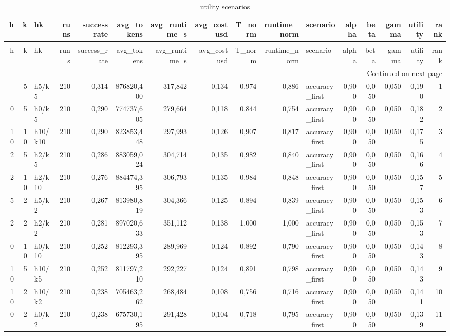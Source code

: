 \begin{longtable}{rrlrrrrrrrlrrrrr}
\caption{utility scenarios} \label{tab:utility_scenarios} \\
\toprule
h & k & hk & runs & success\_rate & avg\_tokens & avg\_runtime\_s & avg\_cost\_usd & T\_norm & runtime\_norm & scenario & alpha & beta & gamma & utility & rank \\
\midrule
\endfirsthead
\caption[]{utility scenarios} \\
\toprule
h & k & hk & runs & success\_rate & avg\_tokens & avg\_runtime\_s & avg\_cost\_usd & T\_norm & runtime\_norm & scenario & alpha & beta & gamma & utility & rank \\
\midrule
\endhead
\midrule
\multicolumn{16}{r}{Continued on next page} \\
\midrule
\endfoot
\bottomrule
\endlastfoot
5 & 5 & h5/k5 & 210 & 0,314 & 876820,400 & 317,842 & 0,134 & 0,974 & 0,886 & accuracy\_first & 0,900 & 0,050 & 0,050 & 0,190 & 1 \\
0 & 5 & h0/k5 & 210 & 0,290 & 774737,605 & 279,664 & 0,118 & 0,844 & 0,754 & accuracy\_first & 0,900 & 0,050 & 0,050 & 0,182 & 2 \\
10 & 10 & h10/k10 & 210 & 0,290 & 823853,448 & 297,993 & 0,126 & 0,907 & 0,817 & accuracy\_first & 0,900 & 0,050 & 0,050 & 0,175 & 3 \\
2 & 5 & h2/k5 & 210 & 0,286 & 883059,024 & 304,714 & 0,135 & 0,982 & 0,840 & accuracy\_first & 0,900 & 0,050 & 0,050 & 0,166 & 4 \\
2 & 10 & h2/k10 & 210 & 0,276 & 884474,395 & 306,793 & 0,135 & 0,984 & 0,848 & accuracy\_first & 0,900 & 0,050 & 0,050 & 0,157 & 5 \\
5 & 2 & h5/k2 & 210 & 0,267 & 813980,819 & 304,366 & 0,125 & 0,894 & 0,839 & accuracy\_first & 0,900 & 0,050 & 0,050 & 0,153 & 6 \\
2 & 2 & h2/k2 & 210 & 0,281 & 897020,633 & 351,112 & 0,138 & 1,000 & 1,000 & accuracy\_first & 0,900 & 0,050 & 0,050 & 0,153 & 7 \\
0 & 10 & h0/k10 & 210 & 0,252 & 812293,395 & 289,969 & 0,124 & 0,892 & 0,790 & accuracy\_first & 0,900 & 0,050 & 0,050 & 0,143 & 8 \\
10 & 5 & h10/k5 & 210 & 0,252 & 811797,210 & 292,227 & 0,124 & 0,891 & 0,798 & accuracy\_first & 0,900 & 0,050 & 0,050 & 0,143 & 9 \\
10 & 2 & h10/k2 & 210 & 0,238 & 705463,262 & 268,484 & 0,108 & 0,756 & 0,716 & accuracy\_first & 0,900 & 0,050 & 0,050 & 0,141 & 10 \\
0 & 2 & h0/k2 & 210 & 0,238 & 675730,195 & 291,428 & 0,104 & 0,718 & 0,795 & accuracy\_first & 0,900 & 0,050 & 0,050 & 0,139 & 11 \\

\end{longtable}
